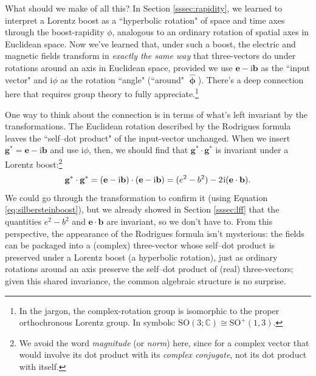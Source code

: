 \documentclass[12pt]{article}
\renewcommand{\vv}[1]{\mathbf{#1}}
\newcommand{\hatphi}{\bm{\hat{\upphi}}}
\begin{document}
What should we make of all this? In Section \ref{sssec:rapidity}, we learned to interpret a Lorentz boost as a ``hyperbolic rotation" of space and time axes through the boost-rapidity $\phi$, analogous to an ordinary rotation of spatial axes in Euclidean space. Now we've learned that, under such a boost, the electric and magnetic fields transform in \emph{exactly the same way} that three-vectors do under rotations around an axis in Euclidean space, provided we use $\vv e - \textrm{i} \vv b$ as the ``input vector" and $\textrm{i} \phi$ as the rotation ``angle" (``around" $\hatphi$). There's a deep connection here that requires group theory to fully appreciate.\footnote{In the jargon, the complex-rotation group is isomorphic to the proper orthochronous Lorentz group. In symbols: $\mathrm{SO}(3;\mathbb{C}) \cong \mathrm{SO}^{+}(1,3)$.}

One way to think about the connection is in terms of what's left invariant by the transformations. The Euclidean rotation described by the Rodrigues formula leaves the ``self--dot product" of the input-vector unchanged. When we insert $\vv g^{*} = \vv e - \textrm{i} \vv b$ and use $\textrm{i} \phi$, then, we should find that $\vv g^{*} \cdot \vv g^{*}$ is invariant under a Lorentz boost:\footnote{We avoid the word \emph{magnitude} (or \emph{norm}) here, since for a complex vector that would involve its dot product with its \emph{complex conjugate}, not its dot product with itself.}
\begin{equation*}
\vv g^{*} \cdot \vv g^{*} = (\vv e - \textrm{i} \vv b) \cdot (\vv e - \textrm{i} \vv b) = (e^2 - b^2) - 2 \mkern1mu \textrm{i} (\vv e \cdot \vv b).
\end{equation*}
We could go through the transformation to confirm it (using Equation \ref{eq:silbersteinboost}), but we already showed in Section \ref{sssec:lff} that the quantities $e^2 - b^2$ and $\vv e \cdot \vv b$ are invariant, so we don't have to. From this perspective, the appearance of the Rodrigues formula isn't mysterious: the fields can be packaged into a (complex) three-vector whose self--dot product is preserved under a Lorentz boost (a hyperbolic rotation), just as ordinary rotations around an axis preserve the self--dot product of (real) three-vectors; given this shared invariance, the common algebraic structure is no surprise.
\end{document}

